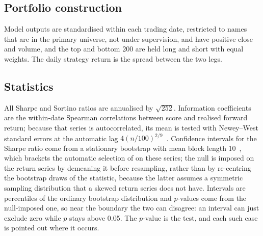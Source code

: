 \subsection{Portfolio construction}
Model outputs are standardised within each trading date, restricted to names
that are in the primary universe, not under supervision, and have positive close
and volume, and the top and bottom \num{200} are held long and short with equal
weights. The daily strategy return is the spread between the two legs.

\subsection{Statistics}
\label{sec:protocol:stats}
All Sharpe and Sortino ratios are annualised by $\sqrt{252}$. Information
coefficients are the within-date Spearman correlations between score and
realised forward return; because that series is autocorrelated, its mean is
tested with Newey--West standard errors at the automatic lag
$4(n/100)^{2/9}$~\citep{newey1987simple,newey1994automatic}. Confidence intervals for the Sharpe
ratio come from a stationary bootstrap with mean block length
\num{10}~\citep{politis1994stationary}, which brackets the automatic selection
of \citet{politis2004automatic} on these series; the null is imposed on the
return series by demeaning it before resampling, rather than by re-centring the
bootstrap draws of the statistic, because the latter assumes a symmetric
sampling distribution that a skewed return series does not have. Intervals
are percentiles of the ordinary bootstrap distribution and $p$-values come from
the null-imposed one, so near the boundary the two can disagree: an interval
can just exclude zero while $p$ stays above \num{0.05}. The $p$-value is the
test, and each such case is pointed out where it occurs.

